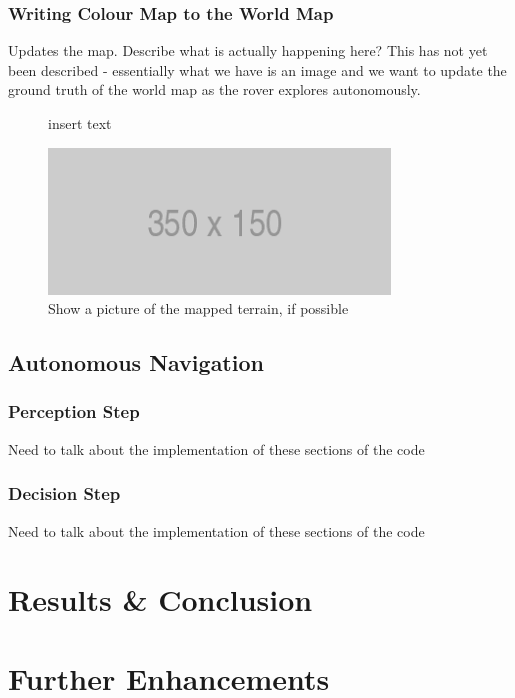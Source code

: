 \documentclass[a4paper]{article}
\begin{document}
\subsubsection{Writing Colour Map to the World Map}

Updates the map. Describe what is actually happening here? This has not yet been described - essentially what we have is an image and we want to update the ground truth of the world map as the rover explores autonomously.

\begin{figure}[h]\scriptsize
\begin{sexylisting}{insert text}

\end{sexylisting}
\end{figure}

\begin{figure}[h]
\centering
\includegraphics[scale=0.5]{placeholder}
\caption{Show a picture of the mapped terrain, if possible}
\end{figure}

\subsection{Autonomous Navigation}
\subsubsection{Perception Step}
Need to talk about the implementation of these sections of the code

\subsubsection{Decision Step}
Need to talk about the implementation of these sections of the code

\section{Results \& Conclusion}

\section{Further Enhancements}
\end{document}

